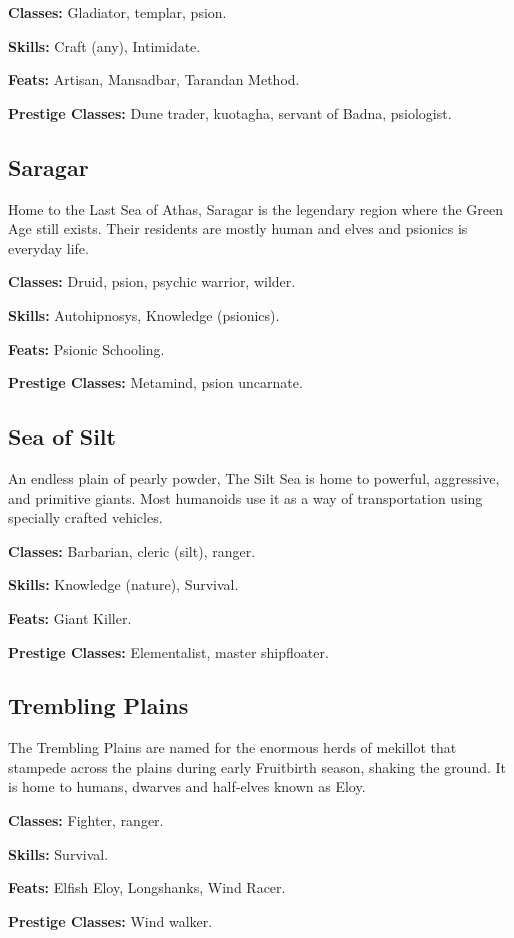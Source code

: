 \textbf{Classes:} Gladiator, templar, psion.

\textbf{Skills:} Craft (any), Intimidate.

\textbf{Feats:} Artisan, Mansadbar, Tarandan Method.

\textbf{Prestige Classes:} Dune trader, kuotagha, servant of Badna, psiologist.

\subsection{Saragar}
Home to the Last Sea of Athas, Saragar is the legendary region where the Green Age still exists. Their residents are mostly human and elves and psionics is everyday life.

\textbf{Classes:} Druid, psion, psychic warrior, wilder.

\textbf{Skills:} Autohipnosys, Knowledge (psionics).

\textbf{Feats:} Psionic Schooling.

\textbf{Prestige Classes:} Metamind, psion uncarnate.


\subsection{Sea of Silt}
An endless plain of pearly powder, The Silt Sea is home to powerful, aggressive, and primitive giants. Most humanoids use it as a way of transportation using specially crafted vehicles.

\textbf{Classes:} Barbarian, cleric (silt), ranger.

\textbf{Skills:} Knowledge (nature), Survival.

\textbf{Feats:} Giant Killer.

\textbf{Prestige Classes:} Elementalist, master shipfloater.


\subsection{Trembling Plains}
The Trembling Plains are named for the enormous herds of mekillot that stampede across the plains during early Fruitbirth season, shaking the ground. It is home to humans, dwarves and half‐elves known as Eloy.

\textbf{Classes:} Fighter, ranger.

\textbf{Skills:} Survival.

\textbf{Feats:} Elfish Eloy, Longshanks, Wind Racer.

\textbf{Prestige Classes:} Wind walker.


